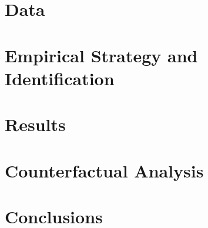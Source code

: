 \documentclass{article}
\begin{document}
\section{Data}\label{sec:data}
    

\section{Empirical Strategy and Identification}\label{sec:empirical_strategy}
    

\section{Results}\label{sec:results}
    

\section{Counterfactual Analysis}\label{sec:counterfactual}
    

\section{Conclusions}\label{sec:conclusion}
    



\clearpage
\printbibliography

\clearpage

\clearpage



\clearpage

\section*{}
\vspace{5mm}

\appendix

\renewcommand\thetable{\thesection.\arabic{table}}    
\renewcommand\thefigure{\thesection.\arabic{figure}} 
\setcounter{table}{0}
\setcounter{figure}{0}


\end{document}
